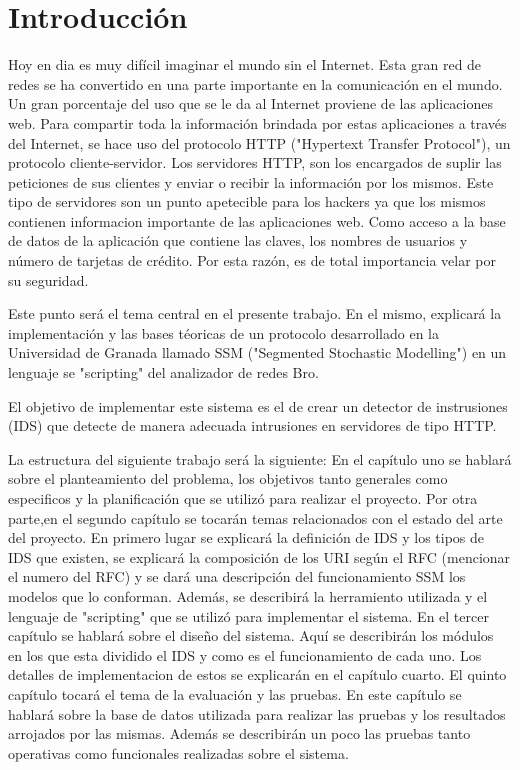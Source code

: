 \chapter*{Introducción}
\label{intro}


Hoy en dia es muy difícil imaginar el mundo sin el Internet. Esta gran red de
redes se ha convertido en una parte importante en la comunicación en el mundo.
Un gran porcentaje del uso que se le da al Internet proviene de las aplicaciones
web. Para compartir toda la información brindada por estas aplicaciones a través del Internet, se hace uso del protocolo HTTP ("Hypertext Transfer Protocol"), un protocolo cliente-servidor. Los servidores HTTP, son los encargados de suplir las peticiones de sus clientes y enviar o recibir la información por los mismos.
Este tipo de servidores son un punto apetecible para los hackers ya que los
mismos contienen informacion importante de las aplicaciones web. Como acceso a
la base de datos de la aplicación que contiene las claves, los nombres de usuarios
y número de tarjetas de crédito. Por esta razón, es de total importancia velar por su seguridad.

Este punto será el tema central en el presente trabajo. En el
mismo, explicará la implementación y las bases téoricas de un protocolo desarrollado en
la Universidad de Granada llamado SSM ("Segmented Stochastic Modelling") en un
lenguaje se "scripting" del analizador de redes Bro.

El objetivo de implementar este sistema es el de crear un detector de instrusiones
(IDS) que detecte de manera adecuada intrusiones en servidores de tipo
HTTP.

La estructura del siguiente trabajo será la siguiente:
En el capítulo uno se hablará sobre el planteamiento del problema,
los objetivos tanto generales como especificos y la planificación que se utilizó para
realizar el proyecto.
Por otra parte,en el segundo capítulo se tocarán temas relacionados con el
estado del arte del proyecto. En primero lugar se explicará la definición de IDS y
los tipos de IDS que existen, se explicará la composición de los URI según el RFC
(mencionar el numero del RFC) y se dará una descripción del funcionamiento SSM
los modelos que lo conforman. Además, se describirá la herramiento utilizada
y el lenguaje de "scripting" que se utilizó para implementar el sistema.
En el tercer capítulo se hablará sobre el diseño del sistema. Aquí se describirán
los módulos en los que esta dividido el IDS y como es el funcionamiento de cada
uno. Los detalles de implementacion de estos se explicarán en el capítulo cuarto.
El quinto capítulo tocará el tema de la evaluación y las pruebas. En este capítulo
se hablará sobre la base de datos utilizada para realizar las pruebas y los
resultados arrojados por las mismas. Además se describirán un poco las pruebas
tanto operativas como funcionales realizadas sobre el sistema.

